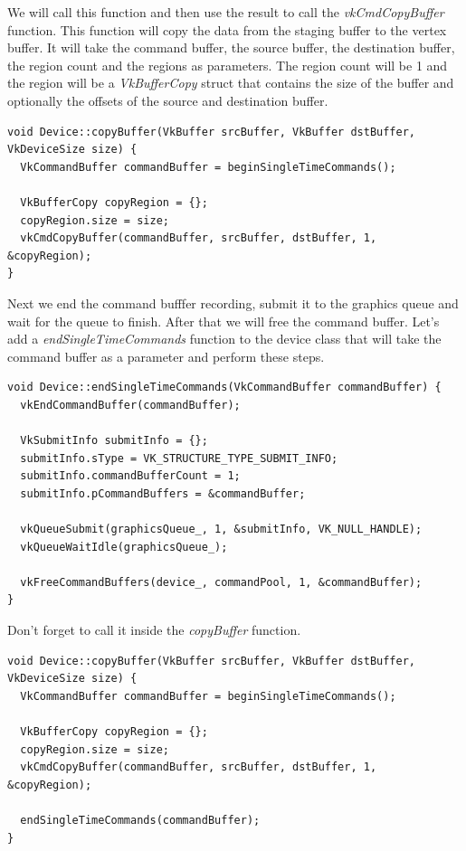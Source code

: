 \documentclass[12pt]{report} \usepackage{preamble}
\begin{document}
We will call this function and then use the result to call the \textit{vkCmdCopyBuffer} function. This function will copy the data from the staging buffer to the vertex buffer.
It will take the command buffer, the source buffer, the destination buffer, the region count and the regions as parameters. The region count will be 1 and the region will be a
\textit{VkBufferCopy} struct that contains the size of the buffer and optionally the offsets of the source and destination buffer.

\begin{lstlisting}[Language=C++]
void Device::copyBuffer(VkBuffer srcBuffer, VkBuffer dstBuffer, VkDeviceSize size) {
  VkCommandBuffer commandBuffer = beginSingleTimeCommands();

  VkBufferCopy copyRegion = {};
  copyRegion.size = size;
  vkCmdCopyBuffer(commandBuffer, srcBuffer, dstBuffer, 1, &copyRegion);
}
\end{lstlisting}

Next we end the command bufffer recording, submit it to the graphics queue and wait for the queue to finish. After that we will free the command buffer.
Let's add a \textit{endSingleTimeCommands} function to the device class that will take the command buffer as a parameter and perform these steps.

\begin{lstlisting}[Language=C++]
void Device::endSingleTimeCommands(VkCommandBuffer commandBuffer) {
  vkEndCommandBuffer(commandBuffer);

  VkSubmitInfo submitInfo = {};
  submitInfo.sType = VK_STRUCTURE_TYPE_SUBMIT_INFO;
  submitInfo.commandBufferCount = 1;
  submitInfo.pCommandBuffers = &commandBuffer;

  vkQueueSubmit(graphicsQueue_, 1, &submitInfo, VK_NULL_HANDLE);
  vkQueueWaitIdle(graphicsQueue_);

  vkFreeCommandBuffers(device_, commandPool, 1, &commandBuffer);
}
\end{lstlisting}

Don't forget to call it inside the \textit{copyBuffer} function.

\begin{lstlisting}[Language=C++]
void Device::copyBuffer(VkBuffer srcBuffer, VkBuffer dstBuffer, VkDeviceSize size) {
  VkCommandBuffer commandBuffer = beginSingleTimeCommands();

  VkBufferCopy copyRegion = {};
  copyRegion.size = size;
  vkCmdCopyBuffer(commandBuffer, srcBuffer, dstBuffer, 1, &copyRegion);

  endSingleTimeCommands(commandBuffer);
}
\end{lstlisting}
\end{document}
